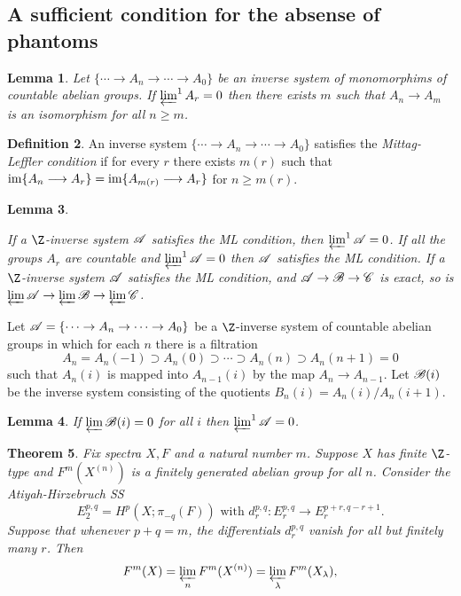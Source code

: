 \documentclass[11pt]{article}
\renewcommand{\comment}{}
\theoremstyle{plain}
\newtheorem{thm}{Theorem}[subsection]
\newtheorem{lem}[thm]{Lemma}
\theoremstyle{definition}
\newtheorem{defn}[thm]{Definition}
\begin{document}
\subsection{A sufficient condition for the absense of phantoms}
\comment{
\begin{lem}
Let $\{\cdots\rightarrow A_{n}\rightarrow\cdots\rightarrow A_0\}$ be an inverse
system of monomorphims of countable abelian groups. If $\varprojlim^1 A_r=0$
then there exists $m$ such that $A_n\to A_m$ is an isomorphism for all $n\geq
m$.
\end{lem}
\begin{defn}
An inverse system $\{\cdots\rightarrow A_{n}\rightarrow\cdots\rightarrow A_0\}$
satisfies the \emph{Mittag-Leffler condition} if for every $r$ there exists
$m(r)$ such that $\operatorname{im}\{A_n\longrightarrow A_r\}=\operatorname{im}\{A_{m(r)}\longrightarrow A_r\}$ for $n\geq m(r)$.
\end{defn}
\begin{lem}
\hfil
\begin{itemise}
\itm[(i)] If a $\Z$-inverse system $\mathscr{A}$ satisfies the ML condition, then
$\varprojlim^1\mathscr{A}=0$.
\itm[(ii)] If all the groups $A_r$ are countable and $\varprojlim^1\mathscr{A}=0$ then
$\mathscr{A}$ satisfies the ML condition.
\itm[(iii)] If a $\Z$-inverse system $\mathscr{A}$ satisfies the ML condition, and
$\mathscr{A}\rightarrow\mathscr{B}\rightarrow\mathscr{C}$ is exact, so is
$\varprojlim\mathscr{A}\rightarrow\varprojlim\mathscr{B}\rightarrow\varprojlim\mathscr{C}$.
\end{itemise}
\end{lem}
Let $\mathscr{A}=\{\cdots\rightarrow A_{n}\rightarrow\cdots\rightarrow A_0\}$ be a
$\Z$-inverse system of countable abelian groups in which for each $n$ there is a
filtration
\[A_n=A_n(-1)\supset A_n(0)\supset\cdots\supset A_n(n)\supset A_n(n+1)=0\]
such that $A_n(i)$ is mapped into $A_{n-1}(i)$ by the map $A_n\to A_{n-1}$. Let
$\mathscr{B}(i)$ be the inverse system consisting of the quotients
$B_n(i)=A_n(i)/A_n(i+1)$.
\begin{lem}
If $\varprojlim\mathscr{B}(i)=0$ for all $i$ then $\varprojlim^1\mathscr{A}=0$.
\end{lem}
\begin{thm}
Fix spectra $X,F$ and a natural number $m$. Suppose $X$ has finite $\Z$-type and
$F^m(X^{(n)})$ is a finitely generated abelian group for all $n$. Consider the
Atiyah-Hirzebruch SS\upcol
\[E_2^{p,q}=H^p(X;\pi_{-q}(F))
\text{\ \ with\ \ }d_r^{p,q}:E_r^{p,q}\to E_r^{p+r,q-r+1}.\]
Suppose that whenever $p+q=m$, the differentials $d_r^{p,q}$ vanish for all but
finitely many $r$. Then
\[F^m(X)=\varprojlim_n F^m(X^{(n)})=\varprojlim_\lambda F^m(X_\lambda),\]

\end{thm}}
\end{document}
